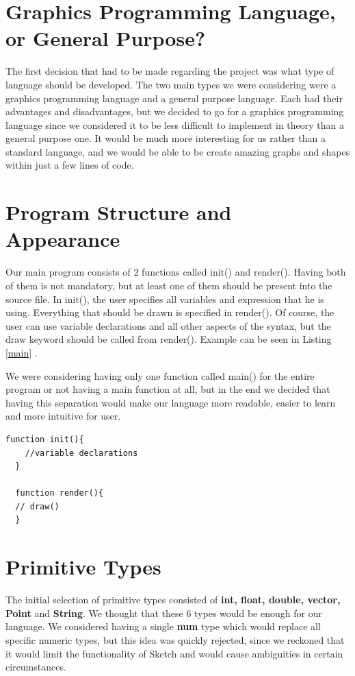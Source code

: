 \documentclass{l3proj}
\begin{document}
\section{Graphics Programming Language, or General Purpose?}
The first decision that had to be made regarding the project was what type of language should be developed. The two main types we were considering were a graphics programming language and a general purpose language. Each had their advantages and disadvantages, but we decided to go for a graphics programming language since we considered it to be less difficult to implement in theory than a general purpose one. It would be much more interesting for us rather than a standard language, and we would be able to be create amazing graphs and shapes within just a few lines of code.  

\section {Program Structure and Appearance}
Our main program consists of 2 functions called init() and render(). Having both of them is not mandatory, but at least one of them should be present into the source file. In init(), the user specifies all variables and expression that he is using. Everything that should be drawn is specified in render(). Of course, the user can use variable declarations and all other aspects of the syntax, but the draw keyword should be called from render(). Example can be seen in Listing \ref{main} .

We were considering having only one function called main() for the entire program or not having a main function at all, but in the end we decided that having this separation would make our language more readable, easier to learn and more intuitive for user.
\begin{center}
\lstset{
    basicstyle=\small\ttfamily,
    frame=lrtb,
  }
 

 
  \begin{lstlisting}[caption= {Main program in Sketch}, label= {main}]
  function init(){
    //variable declarations
  }
 
  function render(){
  // draw()
  }
  \end{lstlisting}
  \end{center}
 
\section{Primitive Types}
The initial selection of primitive types consisted of \textbf{int, float, double, vector, Point} and \textbf{String}. We thought that these 6 types would be enough for our language. We considered having a single \textbf{num} type which would replace all specific numeric types, but this idea was quickly rejected, since we reckoned that it would limit the functionality of Sketch and would cause ambiguities in certain circumstances.
\end{document}

